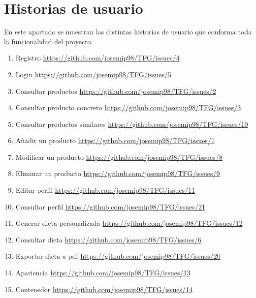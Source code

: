 \chapter{Historias de usuario} \label{apendiceA}

En este apartado se muestran las distintas historias de usuario que conforma toda la funcionalidad del proyecto.

\begin{enumerate}
	\item Registro \url{https://github.com/josemip98/TFG/issues/4}
    \item Login \url{https://github.com/josemip98/TFG/issues/5}
    \item Consultar productos \url{https://github.com/josemip98/TFG/issues/2}
    \item Consultar producto concreto \url{https://github.com/josemip98/TFG/issues/3}
    \item Consultar productos similares \url{https://github.com/josemip98/TFG/issues/10}
    \item Añadir un producto \url{https://github.com/josemip98/TFG/issues/7}
    \item Modificar un producto \url{https://github.com/josemip98/TFG/issues/8}
    \item Eliminar un producto \url{https://github.com/josemip98/TFG/issues/9}
    \item Editar perfil \url{https://github.com/josemip98/TFG/issues/11}
    \item Consultar perfil \url{https://github.com/josemip98/TFG/issues/21}
    \item Generar dieta personalizada \url{https://github.com/josemip98/TFG/issues/12}
    \item Consultar dieta \url{https://github.com/josemip98/TFG/issues/6}
    \item Exportar dieta a pdf \url{https://github.com/josemip98/TFG/issues/20}
    \item Apariencia \url{https://github.com/josemip98/TFG/issues/13}
    \item Contenedor \url{https://github.com/josemip98/TFG/issues/14}
\end{enumerate}

